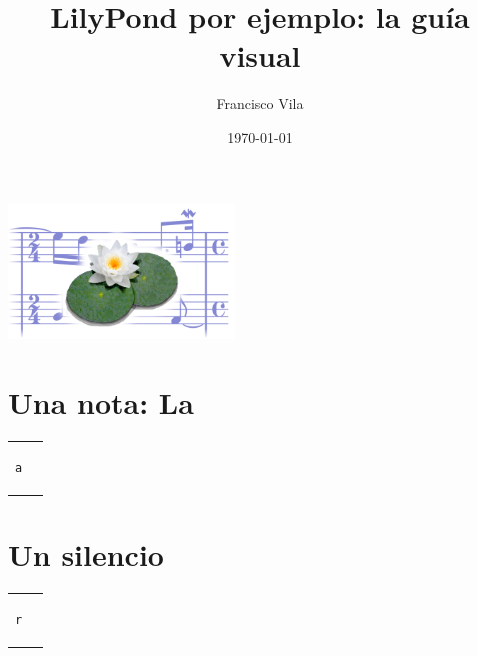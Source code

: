 \documentclass[a4paper,10pt,oneside,headinclude,titlepage]{article} %
\title{LilyPond por ejemplo: la guía visual}
\author{Francisco Vila}
\date{\today}
\begin{document}
\nonfrenchspacing

\begin{titlepage} %
  \makeatletter
  \begin{center}
    \vfill
    \includegraphics[width=60mm]{lily-logo.png}\par
    \vfill
    \textbf{\huge\@title}\par
    {\@date}
    \vfill
    \textbf{\large\@author}
    \vfill
  \end{center}
  \makeatother
\end{titlepage}






\section*{Una nota: La}
\begin{tabular}{m{2cm}m{2cm}}
\begin{verbatim}
a
\end{verbatim}
&
\begin[fragment,notime]{lilypond}
a
\end{lilypond}
\end{tabular}

\section*{Un silencio}
\begin{tabular}{m{2cm}m{2cm}}
\begin{verbatim}
r
\end{verbatim}
&
\begin[fragment,notime]{lilypond}
r
\end{lilypond}
\end{tabular}
\end{document}
